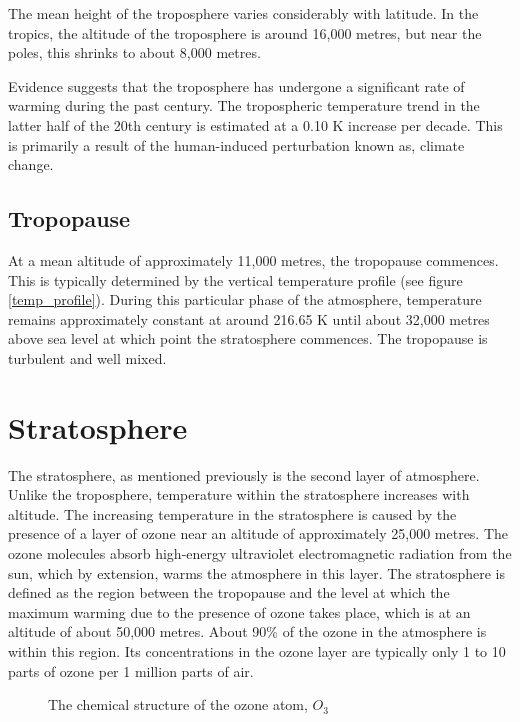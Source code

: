 The mean height of the troposphere varies considerably with latitude. In the tropics, the altitude of the troposphere is around 16,000 metres, but near the poles, this shrinks to about 8,000 metres.

Evidence suggests that the troposphere has undergone a significant rate of warming during the past century. The tropospheric temperature trend in the latter half of the 20th century is estimated at a 0.10 K increase per decade. This is primarily a result of the human-induced perturbation known as, climate change\cite{troposphere}.

\subsection{Tropopause}
At a mean altitude of approximately 11,000 metres, the tropopause commences. This is typically determined by the vertical temperature profile (see figure \ref{temp_profile}). During this particular phase of the atmosphere, temperature remains approximately constant at around 216.65 K until about 32,000 metres above sea level at which point the stratosphere commences. The tropopause is turbulent and well mixed.

\section{Stratosphere}
The stratosphere, as mentioned previously is the second layer of atmosphere. Unlike the troposphere, temperature within the stratosphere increases with altitude. The increasing temperature in the stratosphere is caused by the presence of a layer of ozone near an altitude of approximately 25,000 metres. The ozone molecules absorb high-energy ultraviolet electromagnetic radiation from the sun, which by extension, warms the atmosphere in this layer. The stratosphere is defined as the region between the tropopause and the level at which the maximum warming due to the presence of ozone takes place, which is at an altitude of about 50,000 metres. About 90\% of the ozone in the atmosphere is within this region. Its concentrations in the ozone layer are typically only 1 to 10 parts of ozone per 1 million parts of air\cite{mit}.

\begin{figure}[H]
    \centering
    \caption{The chemical structure of the ozone atom, $O_3$}
    \label{ozone}
\end{figure}

